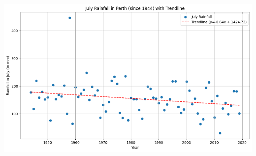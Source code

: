 \documentclass[
  letterpaper,
  DIV=11,
  numbers=noendperiod]{scrartcl}
\begin{document}
\includegraphics{Assignment-1_ICP_files/figure-pdf/cell-4-output-1.png}
\end{document}
